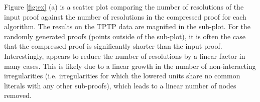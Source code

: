 

Figure \ref{fig:ex} (a) is a scatter plot comparing the number of resolutions of the input proof against the number of resolutions in the compressed proof for each algorithm. The results on the TPTP data are magnified in the sub-plot. For the randomly generated proofs (points outside of the sub-plot), it is often the case that the compressed proof is significantly shorter than the input proof. Interestingly, {\GFOLU} appears to reduce the number of resolutions by a linear factor in many cases. This is likely due to a linear growth in the number of non-interacting irregularities (i.e. irregularities for which the lowered units share no common literals with any other sub-proofs), which leads to a linear number of nodes removed.


